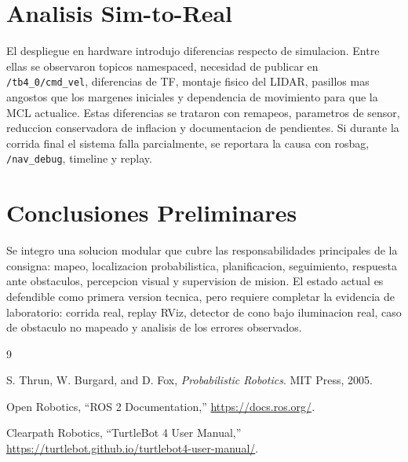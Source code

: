 \documentclass[conference]{IEEEtran}
\begin{document}
\section{Analisis Sim-to-Real}

El despliegue en hardware introdujo diferencias respecto de simulacion. Entre
ellas se observaron topicos namespaced, necesidad de publicar en
\texttt{/tb4\_0/cmd\_vel}, diferencias de TF, montaje fisico del LIDAR, pasillos
mas angostos que los margenes iniciales y dependencia de movimiento para que la
MCL actualice. Estas diferencias se trataron con remapeos, parametros de sensor,
reduccion conservadora de inflacion y documentacion de pendientes. Si durante la
corrida final el sistema falla parcialmente, se reportara la causa con rosbag,
\texttt{/nav\_debug}, timeline y replay.

\section{Conclusiones Preliminares}

Se integro una solucion modular que cubre las responsabilidades principales de
la consigna: mapeo, localizacion probabilistica, planificacion, seguimiento,
respuesta ante obstaculos, percepcion visual y supervision de mision. El estado
actual es defendible como primera version tecnica, pero requiere completar la
evidencia de laboratorio: corrida real, replay RViz, detector de cono bajo
iluminacion real, caso de obstaculo no mapeado y analisis de los errores
observados.

\begin{thebibliography}{9}

S. Thrun, W. Burgard, and D. Fox, \emph{Probabilistic Robotics}. MIT Press, 2005.

Open Robotics, ``ROS 2 Documentation,'' \url{https://docs.ros.org/}.

Clearpath Robotics, ``TurtleBot 4 User Manual,'' \url{https://turtlebot.github.io/turtlebot4-user-manual/}.

\end{thebibliography}
\end{document}
